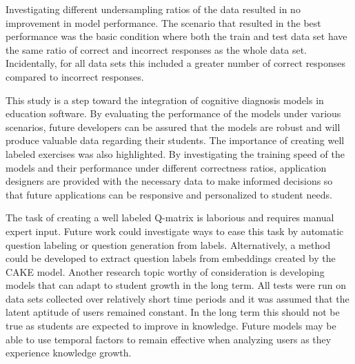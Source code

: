 \documentclass[letterpaper, 12pt, captions=tableabove]{scrreprt}
\begin{document}
Investigating different undersampling ratios of the data resulted in no improvement in model performance. The scenario that resulted in the best performance was the basic condition where both the train and test data set have the same ratio of correct and incorrect responses as the whole data set. Incidentally, for all data sets this included a greater number of correct responses compared to incorrect responses.

	This study is a step toward the integration of cognitive diagnosis models in education software. By evaluating the performance of the models under various scenarios, future developers can be assured that the models are robust and will produce valuable data regarding their students. The importance of creating well labeled exercises was also highlighted. By investigating the training speed of the models and their performance under different correctness ratios, application designers are provided with the necessary data to make informed decisions so that future applications can be responsive and personalized to student needs. 

	The task of creating a well labeled Q-matrix is laborious and requires manual expert input. Future work could investigate ways to ease this task by automatic question labeling or question generation from labels. Alternatively, a method could be developed to extract question labels from embeddings created by the CAKE model. Another research topic worthy of consideration is developing models that can adapt to student growth in the long term. All tests were run on data sets collected over relatively short time periods and it was assumed that the latent aptitude of users remained constant. In the long term this should not be true as students are expected to improve in knowledge. Future models may be able to use temporal factors to remain effective when analyzing users as they experience knowledge growth.

\renewcommand\bibname{Works Cited}


\end{document}
